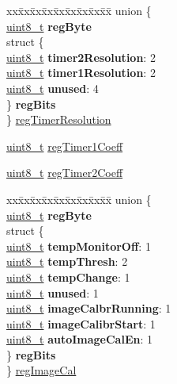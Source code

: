 \begin{DoxyCompactItemize}
\begin{tabbing}
\end{tabbing}\item 
\begin{tabbing}
xx\=xx\=xx\=xx\=xx\=xx\=xx\=xx\=xx\=\kill
union \{\\
\>\hyperlink{vl53l0x__types_8h_aba7bc1797add20fe3efdf37ced1182c5}{uint8\_t} {\bfseries regByte}\\
\>struct \{\\
\>\>\hyperlink{vl53l0x__types_8h_aba7bc1797add20fe3efdf37ced1182c5}{uint8\_t} {\bfseries timer2Resolution}: 2\\
\>\>\hyperlink{vl53l0x__types_8h_aba7bc1797add20fe3efdf37ced1182c5}{uint8\_t} {\bfseries timer1Resolution}: 2\\
\>\>\hyperlink{vl53l0x__types_8h_aba7bc1797add20fe3efdf37ced1182c5}{uint8\_t} {\bfseries unused}: 4\\
\>\} {\bfseries regBits}\\
\} \hyperlink{structFSK__Register__Map_a4f191c94ee411120b090f19acebdeb87}{regTimerResolution}\\

\end{tabbing}\item 
\hyperlink{vl53l0x__types_8h_aba7bc1797add20fe3efdf37ced1182c5}{uint8\+\_\+t} \hyperlink{structFSK__Register__Map_ac4d8dc321cd5cb47d5844a2882c81f11}{reg\+Timer1\+Coeff}
\item 
\hyperlink{vl53l0x__types_8h_aba7bc1797add20fe3efdf37ced1182c5}{uint8\+\_\+t} \hyperlink{structFSK__Register__Map_af69c2c867b524f2402499b5102d6384f}{reg\+Timer2\+Coeff}
\item 
\begin{tabbing}
xx\=xx\=xx\=xx\=xx\=xx\=xx\=xx\=xx\=\kill
union \{\\
\>\hyperlink{vl53l0x__types_8h_aba7bc1797add20fe3efdf37ced1182c5}{uint8\_t} {\bfseries regByte}\\
\>struct \{\\
\>\>\hyperlink{vl53l0x__types_8h_aba7bc1797add20fe3efdf37ced1182c5}{uint8\_t} {\bfseries tempMonitorOff}: 1\\
\>\>\hyperlink{vl53l0x__types_8h_aba7bc1797add20fe3efdf37ced1182c5}{uint8\_t} {\bfseries tempThresh}: 2\\
\>\>\hyperlink{vl53l0x__types_8h_aba7bc1797add20fe3efdf37ced1182c5}{uint8\_t} {\bfseries tempChange}: 1\\
\>\>\hyperlink{vl53l0x__types_8h_aba7bc1797add20fe3efdf37ced1182c5}{uint8\_t} {\bfseries unused}: 1\\
\>\>\hyperlink{vl53l0x__types_8h_aba7bc1797add20fe3efdf37ced1182c5}{uint8\_t} {\bfseries imageCalbrRunning}: 1\\
\>\>\hyperlink{vl53l0x__types_8h_aba7bc1797add20fe3efdf37ced1182c5}{uint8\_t} {\bfseries imageCalibrStart}: 1\\
\>\>\hyperlink{vl53l0x__types_8h_aba7bc1797add20fe3efdf37ced1182c5}{uint8\_t} {\bfseries autoImageCalEn}: 1\\
\>\} {\bfseries regBits}\\
\} \hyperlink{structFSK__Register__Map_a6bf176c426d56ef40727de470950b45d}{regImageCal}\\


\end{tabbing}
\end{DoxyCompactItemize}
